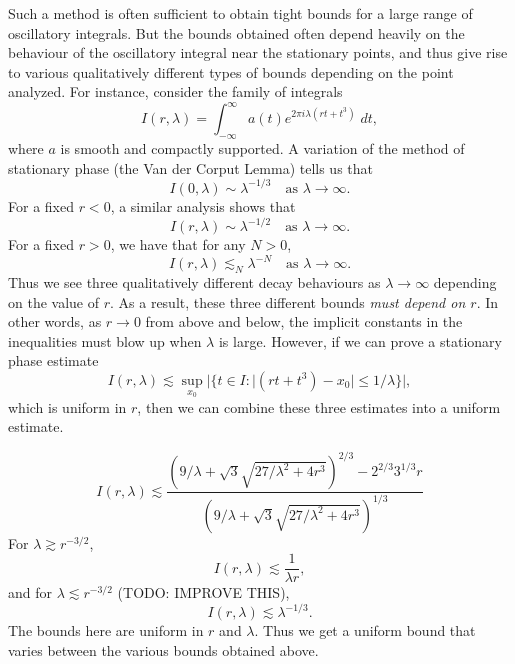 Such a method is often sufficient to obtain tight bounds for a large range of oscillatory integrals. But the bounds obtained often depend heavily on the behaviour of the oscillatory integral near the stationary points, and thus give rise to various qualitatively different types of bounds depending on the point analyzed. For instance, consider the family of integrals
%
\[ I(r,\lambda) = \int_{-\infty}^\infty a(t) e^{2 \pi i \lambda (rt + t^3)}\; dt, \]
%
where $a$ is smooth and compactly supported. A variation of the method of stationary phase (the Van der Corput Lemma) tells us that
%
\[ I(0,\lambda) \sim \lambda^{-1/3} \quad\text{as $\lambda \to \infty$}. \]
%
For a fixed $r < 0$, a similar analysis shows that
%
\[ I(r,\lambda) \sim \lambda^{-1/2} \quad\text{as $\lambda \to \infty$}. \]
%
For a fixed $r > 0$, we have that for any $N > 0$,
%
\[ I(r,\lambda) \lesssim_N \lambda^{-N} \quad\text{as $\lambda \to \infty$}. \]
%
Thus we see three qualitatively different decay behaviours as $\lambda \to \infty$ depending on the value of $r$. As a result, these three different bounds \emph{must depend on $r$}. In other words, as $r \to 0$ from above and below, the implicit constants in the inequalities must blow up when $\lambda$ is large. However, if we can prove a stationary phase estimate
%
\[ I(r,\lambda) \lesssim \sup_{x_0} |\{ t \in I : |(rt + t^3) - x_0| \leq 1/\lambda \}|, \]
%
which is uniform in $r$, then we can combine these three estimates into a uniform estimate. 

%
%
%
\[ I(r,\lambda) \lesssim \frac{(9 / \lambda + \sqrt{3} \sqrt{27/\lambda^2 + 4r^3})^{2/3} - 2^{2/3} 3^{1/3} r}{(9/\lambda + \sqrt{3} \sqrt{27/\lambda^2 + 4r^3})^{1/3}} \]
%
For $\lambda \gtrsim r^{-3/2}$,
%
\[ I(r,\lambda) \lesssim \frac{1}{\lambda r}, \]
%
and for $\lambda \lesssim r^{-3/2}$ (TODO: IMPROVE THIS),
%
\[ I(r,\lambda) \lesssim \lambda^{-1/3}. \]
%
The bounds here are uniform in $r$ and $\lambda$. Thus we get a uniform bound that varies between the various bounds obtained above.


%


